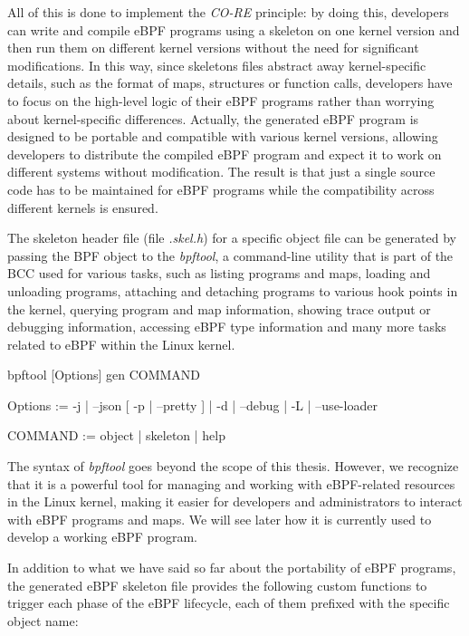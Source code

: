 All of this is done to implement the \textit{CO-RE} principle: by doing this, developers can write and compile eBPF programs using a skeleton on one kernel version and then run them on different kernel versions without the need for significant modifications.
In this way, since skeletons files abstract away kernel-specific details, such as the format of maps, structures or function calls, developers have to focus on the high-level logic of their eBPF programs rather than worrying about kernel-specific differences.
Actually, the generated eBPF program is designed to be portable and compatible with various kernel versions, allowing developers to distribute the compiled eBPF program and expect it to work on different systems without modification.
The result is that just a single source code has to be maintained for eBPF programs while the compatibility across different kernels is ensured.

The skeleton header file (file \textit{.skel.h}) for a specific object file can be generated by passing the BPF object to the \textit{bpftool}, a command-line utility that is part of the BCC used for various tasks, such as listing programs and maps, loading and unloading programs, attaching and detaching programs to various hook points in the kernel, querying program and map information, showing trace output or debugging information, accessing eBPF type information and many more tasks related to eBPF within the Linux kernel.


bpftool [Options] gen COMMAND

Options := { { -j | --json } [{ -p | --pretty }] | { -d | --debug } | { -L | --use-loader } }

COMMAND := { object | skeleton | help }

The syntax of \textit{bpftool} goes beyond the scope of this thesis.
However, we recognize that it is a powerful tool for managing and working with eBPF-related resources in the Linux kernel, making it easier for developers and administrators to interact with eBPF programs and maps.
We will see later how it is currently used to develop a working eBPF program.

In addition to what we have said so far about the portability of eBPF programs, the generated eBPF skeleton file provides the following custom functions to trigger each phase of the eBPF lifecycle, each of them prefixed with the specific object name:


